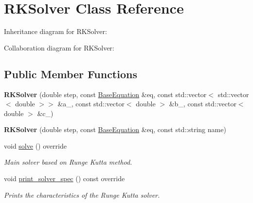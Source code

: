 \hypertarget{classRKSolver}{}\section{R\+K\+Solver Class Reference}
\label{classRKSolver}


Inheritance diagram for R\+K\+Solver\+:


Collaboration diagram for R\+K\+Solver\+:
\subsection*{Public Member Functions}
\begin{DoxyCompactItemize}
\item 
\mbox{\label{classRKSolver_a47393b170acf8f25fb5110448ba4981b}} 
{\bfseries R\+K\+Solver} (double step, const \hyperlink{classBaseEquation}{Base\+Equation} \&eq, const std\+::vector$<$ std\+::vector$<$ double $>$$>$ \&a\+\_\+, const std\+::vector$<$ double $>$ \&b\+\_\+, const std\+::vector$<$ double $>$ \&c\+\_\+)
\item 
\mbox{\label{classRKSolver_aa1b51cd0bb2327b364d3a47f131d8bf0}} 
{\bfseries R\+K\+Solver} (double step, const \hyperlink{classBaseEquation}{Base\+Equation} \&eq, const std\+::string name)
\item 
\mbox{\label{classRKSolver_aa251eaaa56b4ef39d95347579b8a6259}} 
void \hyperlink{classRKSolver_aa251eaaa56b4ef39d95347579b8a6259}{solve} () override
\begin{DoxyCompactList}\small\item\em Main solver based on Runge Kutta method. \end{DoxyCompactList}\item 
\mbox{\label{classRKSolver_af7ec0ddafd838e03c9db344a2abd8674}} 
void \hyperlink{classRKSolver_af7ec0ddafd838e03c9db344a2abd8674}{print\+\_\+solver\+\_\+spec} () const override
\begin{DoxyCompactList}\small\item\em Prints the characteristics of the Runge Kutta solver. \end{DoxyCompactList}\end{DoxyCompactItemize}
